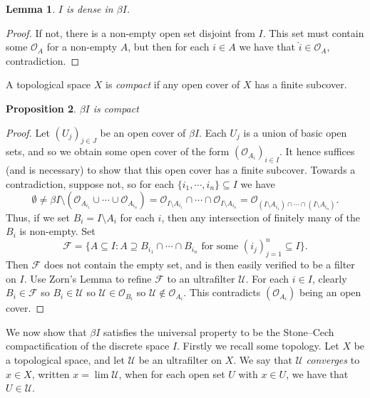 \documentclass[a4paper,12pt]{article}
\theoremstyle{plain}
\newtheorem{proposition}{Proposition}[section]
\newtheorem{lemma}[proposition]{Lemma}
\theoremstyle{definition}
\newcommand{\mc}[1]{\mathcal{#1}}
\begin{document}
\begin{lemma}
$I$ is dense in $\beta I$.
\end{lemma}
\begin{proof}
If not, there is a non-empty open set disjoint from $I$.  This set must contain some $\mc O_A$ for
a non-empty $A$, but then for each $i\in A$ we have that $\hat i\in\mc O_A$, contradiction.
\end{proof}

A topological space $X$ is \emph{compact} if any open cover of $X$ has a finite subcover.

\begin{proposition}
$\beta I$ is compact
\end{proposition}
\begin{proof}
Let $(U_j)_{j\in J}$ be an open cover of $\beta I$.  Each $U_j$ is a union of basic open sets, and so
we obtain some open cover of the form $(\mc O_{A_i})_{i\in I}$.  It hence suffices (and is necessary)
to show that this open cover has a finite subcover.  Towards a contradiction, suppose not, so for
each $\{i_1,\cdots,i_n\}\subseteq I$ we have
\[ \emptyset \not= \beta I \setminus ( \mc O_{A_{i_1}} \cup \cdots \cup \mc O_{A_{i_n}} )
= \mc O_{I\setminus A_{i_1}} \cap\cdots\cap \mc O_{I\setminus A_{i_n}}
= \mc O_{(I\setminus A_{i_1}) \cap\cdots\cap (I\setminus A_{i_n})}. \]
Thus, if we set $B_i = I\setminus A_i$ for each $i$, then any intersection of finitely many of the $B_i$
is non-empty.  Set
\[ \mc F = \{ A\subseteq I : A \supseteq B_{i_1} \cap\cdots\cap B_{i_n}
\text{ for some } (i_j)_{j=1}^n \subseteq I \}. \]
Then $\mc F$ does not contain the empty set, and is then easily verified to be a filter on $I$.  Use Zorn's
Lemma to refine $\mc F$ to an ultrafilter $\mc U$.  For each $i\in I$, clearly $B_i\in\mc F$ so
$B_i\in\mc U$ so $\mc U \in \mc O_{B_i}$ so $\mc U \not\in \mc O_{A_i}$.  This contradicts $(\mc O_{A_i})$
being an open cover.
\end{proof}

We now show that $\beta I$ satisfies the universal property to be the Stone--Cech compactification of
the discrete space $I$.  Firstly we recall some topology.  Let $X$ be a topological space, and let $\mc U$
be an ultrafilter on $X$.  We say that $\mc U$ \emph{converges} to $x\in X$, written $x=\lim \mc U$, when
for each open set $U$ with $x\in U$, we have that $U\in\mc U$.
\end{document}
